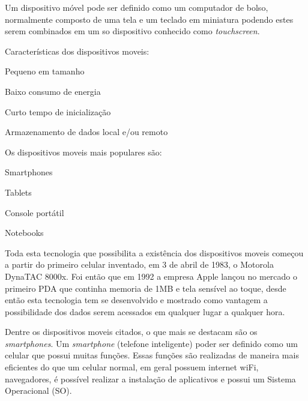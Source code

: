 Um dispositivo móvel pode ser definido como um computador de bolso, normalmente composto de uma tela e um teclado em miniatura podendo estes serem combinados em um so dispositivo conhecido como \textit{ touchscreen}.

Características dos dispositivos moveis:

\begin{alineascomponto}
 
\item Pequeno em tamanho
\item Baixo consumo de energia
\item Curto tempo de inicialização
\item Armazenamento de dados local e/ou remoto

	\end{alineascomponto}


Os dispositivos moveis mais populares são:

\begin{alineascomponto}
 
\item Smartphones
\item Tablets
\item Console portátil
\item Notebooks

	\end{alineascomponto}
	

Toda esta tecnologia que possibilita a existência dos dispositivos moveis começou a partir do primeiro celular inventado, em 3 de abril de 1983, o Motorola DynaTAC 8000x. Foi então que em 1992 a empresa Apple lançou no mercado o primeiro PDA que continha memoria de 1MB e tela sensível ao toque, desde então esta tecnologia tem se desenvolvido e mostrado como
vantagem  a possibilidade dos dados serem acessados em qualquer lugar a qualquer hora.

Dentre os dispositivos moveis citados, o que mais se destacam são os \textit{smartphones}. Um \textit{smartphone} (telefone inteligente) poder ser definido como um celular que possui muitas funções. Essas funções são realizadas de maneira mais eficientes do que um celular normal, em geral possuem internet wiFi, navegadores, é possível realizar a instalação de aplicativos e possui um Sistema Operacional (SO). 

